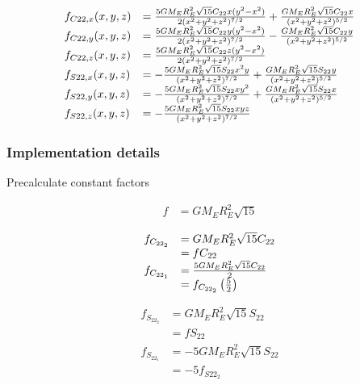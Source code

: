 \documentclass{article}
\begin{document}
\begin{equation}
\begin{array}{ll}
f_{C22,x}(x,y,z) &= {5GM_ER_E^2\sqrt{15}C_{22}x(y^2-x^2)\over 2(x^2+y^2+z^2)^{7/2}}+{GM_ER_E^2\sqrt{15}C_{22}x\over(x^2+y^2+z^2)^{5/2}} \\
f_{C22,y}(x,y,z) &= {5GM_ER_E^2\sqrt{15}C_{22}y(y^2-x^2)\over 2(x^2+y^2+z^2)^{7/2}}-{GM_ER_E^2\sqrt{15}C_{22}y\over(x^2+y^2+z^2)^{5/2}} \\
f_{C22,z}(x,y,z) &= {5GM_ER_E^2\sqrt{15}C_{22}z(y^2-x^2)\over 2(x^2+y^2+z^2)^{7/2}}\\
f_{S22,x}(x,y,z) &= -{5GM_ER_E^2\sqrt{15}S_{22}x^2y\over (x^2+y^2+z^2)^{7/2}}+{GM_ER_E^2\sqrt{15}S_{22}y\over(x^2+y^2+z^2)^{5/2}} \\
f_{S22,y}(x,y,z) &= -{5GM_ER_E^2\sqrt{15}S_{22}xy^2\over (x^2+y^2+z^2)^{7/2}}+{GM_ER_E^2\sqrt{15}S_{22}x\over(x^2+y^2+z^2)^{5/2}} \\
f_{S22,z}(x,y,z) &= -{5GM_ER_E^2\sqrt{15}S_{22}xyz\over (x^2+y^2+z^2)^{7/2}}
\end{array}
\end{equation}

\subsubsection{Implementation details}

Precalculate constant factors

\begin{equation}
\begin{array}{ll}
f &= {GM_ER_E^2\sqrt{15}}
\end{array}
\end{equation}

\begin{equation}
\begin{array}{ll}
f_{C_{22_2}} &= {GM_ER_E^2\sqrt{15}C_{22}} \\
             &= fC_{22} \\
f_{C_{22_1}} &= {{5GM_ER_E^2\sqrt{15}C_{22}} \over {2}} \\
             &= f_{C_{22_2}}\left( 5 \over 2\right)
\end{array}
\end{equation}

\begin{equation}
\begin{array}{ll}
f_{S_{22_2}} &= {GM_ER_E^2\sqrt{15}S_{22}} \\
             &= fS_{22} \\
f_{S_{22_1}} &= {-5GM_ER_E^2\sqrt{15}S_{22}} \\
             &= -5f_{S22_2}
\end{array}
\end{equation}
\end{document}
